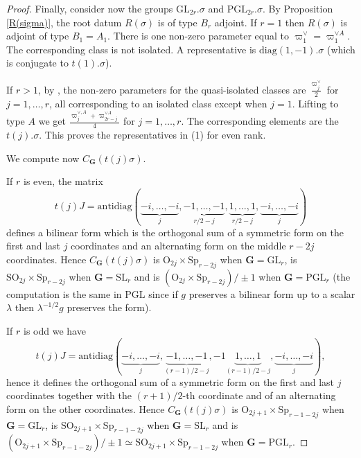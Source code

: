 \documentclass{amsart}
\numberwithin{equation}{section}
\theoremstyle{definition}
\theoremstyle{remark}
\newcommand\bG{{\mathbf G}}
\newcommand\GL{\mathrm{GL}}
\newcommand\SL{\mathrm{SL}}
\newcommand\PGL{\mathrm{PGL}}
\newcommand\Orth{\mathrm{O}}
\newcommand\SO{\mathrm{SO}}
\newcommand\Sp{\mathrm{Sp}}
\newcommand\diag{\mathrm{diag}}
\newcommand\antidiag{\mathrm{antidiag}}
\begin{document}
\begin{proof}
Finally,  consider now the groups $\GL_{2r}.\sigma$ and $\PGL_{2r}.\sigma$.
By  Proposition \ref{R(sigma)}, the root datum $R(\sigma)$ is of type $B_r$
adjoint. If $r=1$ then $R(\sigma)$ is adjoint of type $B_1=A_1$. There is one
non-zero parameter equal to $\varpi_1^\vee=\varpi_1^{\vee A}$.
The corresponding class is not isolated. A representative is 
$\diag(1,-1).\sigma$ (which is conjugate to $t(1).\sigma$).

If   $r>1$,  by  \cite[4.E.1]{cedric},  the  non-zero  parameters  for  the
quasi-isolated  classes are $\frac{\varpi_j^\vee}2$ for $j=1,\ldots,r$, all
corresponding  to an isolated class except  when $j=1$. Lifting to type $A$
we     get     $\frac{\varpi_j^{\vee,A}+\varpi_{2r-j}^{\vee A}}4$    for
$j=1,\ldots,r$. The corresponding elements are the $t(j).\sigma$.
This proves the representatives in  (1) for even rank.

We compute now $C_\bG(t(j)\sigma)$.

If $r$ is even, the matrix $$t(j)J=
\antidiag(\underbrace{-i,\ldots,-i}_j,\underbrace{-1,\ldots,-1}_{r/2-j},
\underbrace{1,\ldots,1}_{r/2-j},\underbrace{-i,\ldots,-i}_j)$$   defines  a
bilinear  form which is the orthogonal sum of a symmetric form on the first
and  last  $j$  coordinates  and  an  alternating form on the middle $r-2j$
coordinates.  Hence  $C_\bG(t(j)\sigma)$  is  $\Orth_{2j}\times \Sp_{r-2j}$
when  $\bG=\GL_r$, is  $\SO_{2j}\times\Sp_{r-2j}$  when  $\bG=\SL_r$ and is
$(\Orth_{2j}\times\Sp_{r-2j})/\pm1$ when $\bG=\PGL_r$ (the computation is the
same  in  $\PGL$  since  if  $g$  preserves  a bilinear form up to a scalar
$\lambda$ then $\lambda^{-1/2} g$ preserves the form).

If $r$ is odd we have $$t(j)J=
\antidiag(\underbrace{-i,\ldots,-i}_j,\underbrace{-1,\ldots,-1}_{(r-1)/2-j},-1
\underbrace{1,\ldots,1}_{(r-1)/2-j},\underbrace{-i,\ldots,-i}_j),$$ hence it
defines  the orthogonal sum of  a symmetric form on  the first and last $j$
coordinates  together with  the $(r+1)/2$-th  coordinate and  of an alternating
form on the other coordinates. Hence $C_\bG(t(j)\sigma)$ is
$\Orth_{2j+1}\times  \Sp_{r-1-2j}$  when  $\bG=\GL_r$, is $\SO_{2j+1}\times
\Sp_{r-1-2j}$  when $\bG=\SL_r$ and is $(\Orth_{2j+1}\times\Sp_{r-1-2j})/\pm1
\simeq\SO_{2j+1}\times \Sp_{r-1-2j}$ when $\bG=\PGL_r$.


\end{proof}
\end{document}
